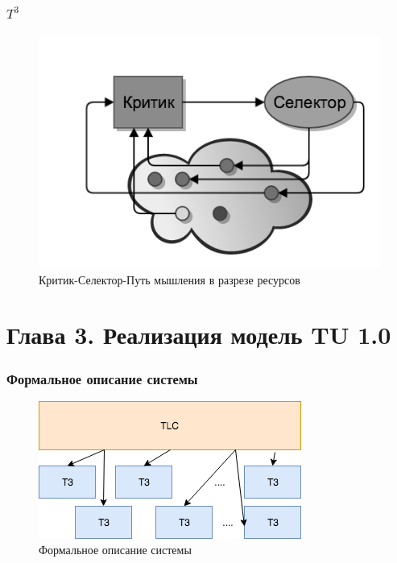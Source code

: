 \documentclass[14pt]{beamer}
\begin{document}
\begin{frame}
\frametitle{$T^3$}
\begin{figure} [h] 
  \center
  \includegraphics [scale=0.6] {CSW_EX}
  \caption{Критик-Селектор-Путь мышления в разрезе ресурсов} 
  \label{img:csw_ex} 
\end{figure}
\end{frame}







%
%
\section[Глава 3]{Глава 3. Реализация модель TU 1.0}


\begin{frame}
\frametitle{Формальное описание системы}
\begin{figure} [h] 
  \center
  \includegraphics [scale=0.6] {SystemOverview.png}
  \caption{Формальное описание системы} 
  \label{img:SystemOverview.png} 
\end{figure}
\end{frame}
\end{document}
